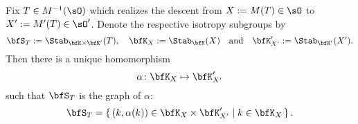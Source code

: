 \documentclass[12pt,a4paper]{amsart}
\numberwithin{equation}{section}
\newtheorem{lem}[thm]{Lemma}
\theoremstyle{remark}
\def\MMP{M}
\def\Xo{\cX^\circ}
\begin{document}
  Fix $T\in \MMP^{-1}(\sO)$ which realizes the descent from $X := \MMP(T)\in \sO$
  to $X' := \MMP'(T)\in \sO'$. Denote the respective isotropy subgroups by
  \[
    \bfS_T :=
    \Stab_{\bfK\times \bfK'}(T), \quad  \bfK_X:= \Stab_{\bfK}(X)\quad \text{and}\quad \bfK'_{X'}
    := \Stab_{\bfK'}(X').
  \]
  Then there is a unique homomorphism
  \begin{equation}
    \label{eq:alpha}
    \alpha\colon \bfK_X \mapsto \bfK'_{X'}
  \end{equation}
  such that $\bfS_T$ is the graph of $\alpha$:
  \[
    \bfS_T = \set{(k,\alpha(k))\in \bfK_X\times \bfK'_{X'}|k\in \bfK_X}.
  \]
\end{document}
